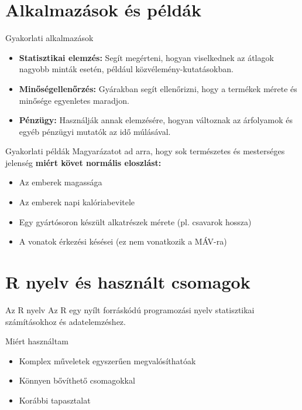 \documentclass[aspectratio=169,12pt]{beamer}
\begin{document}
	\section{Alkalmazások és példák}
	\begin{frame}{Gyakorlati alkalmazások}
		\begin{itemize}
			\item \textbf{Statisztikai elemzés:} Segít megérteni, hogyan viselkednek az átlagok nagyobb minták esetén, például közvélemény-kutatásokban.
			\item \textbf{Minőségellenőrzés:} Gyárakban segít ellenőrizni, hogy a termékek mérete és minősége egyenletes maradjon.
			\item \textbf{Pénzügy:} Használják annak elemzésére, hogyan változnak az árfolyamok és egyéb pénzügyi mutatók az idő múlásával.
		\end{itemize}
	\end{frame}
	
	\begin{frame}{Gyakorlati példák}
		Magyarázatot ad arra, hogy sok természetes és mesterséges jelenség \textbf{miért követ normális eloszlást:}
		\begin{itemize}
			\item Az emberek magassága
			\item Az emberek napi kalóriabevitele
			\item Egy gyártósoron készült alkatrészek mérete (pl. csavarok hossza)
			\item A vonatok érkezési késései (ez nem vonatkozik a MÁV-ra)
		\end{itemize}
	\end{frame}
	
	\section{R nyelv és használt csomagok}
	\begin{frame}{Az R nyelv}
		Az R egy nyílt forráskódú programozási nyelv statisztikai számításokhoz és adatelemzéshez.
		\vfill
		\begin{block}{Miért használtam}
			\begin{itemize}
				\item Komplex műveletek egyszerűen megvalósíthatóak
				\item Könnyen bővíthető csomagokkal
				\item Korábbi tapasztalat
			\end{itemize}
		\end{block}
	\end{frame}
	
\end{document}

